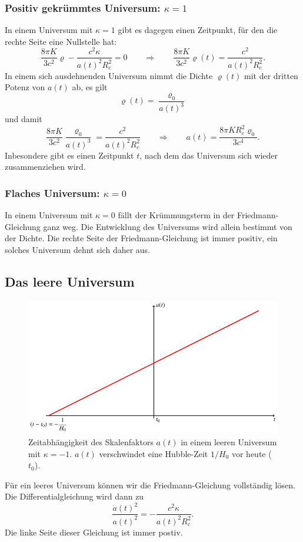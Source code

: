 \subsubsection{Positiv gekrümmtes Universum: $\kappa=1$}
In einem Universum mit $\kappa=1$ gibt es dagegen einen Zeitpunkt, für
den die rechte Seite eine Nullstelle hat:
\[
\frac{8\pi K}{3c^2}\varrho -\frac{c^2\kappa}{a(t)^2R_c^2}=0
\qquad\Rightarrow\qquad
\frac{8\pi K}{3c^2}\varrho(t)=\frac{c^2}{a(t)^2R_c^2}.
\]
In einem sich ausdehnenden Universum nimmt die Dichte $\varrho(t)$ mit
der dritten Potenz von $a(t)$ ab, es gilt
\[
\varrho(t) = \frac{\varrho_0}{a(t)^3}
\]
und damit
\[
\frac{8\pi K}{3c^2}\frac{\varrho_0}{a(t)^3}=\frac{c^2}{a(t)^2R_c^2}
\qquad\Rightarrow\qquad
a(t)
=
\frac{8\pi K R_c^2\varrho_0}{3c^4}.
\]
Inbesondere gibt es einen Zeitpunkt $t$, nach dem das Universum sich
wieder zusammenziehen wird.

\subsubsection{Flaches Universum: $\kappa=0$}
In einem Universum mit $\kappa=0$ fällt der Krümmungsterm in 
der Friedmann-Gleichung ganz weg.
Die Entwicklung des Universums wird allein bestimmt von der Dichte.
Die rechte Seite der Friedmann-Gleichung ist immer positiv, ein
solches Universum dehnt sich daher aus.

\subsection{Das leere Universum}
\begin{figure}
\centering
\includegraphics{chapters/tikz/friedmann-leer.pdf}
\caption{Zeitabhängigkeit des Skalenfaktors $a(t)$ in einem leeren
Universum mit $\kappa = -1$.
$a(t)$ verschwindet eine Hubble-Zeit $1/H_0$ vor heute ($t_0$).
\label{chapter:friedmann:graph:leer}}
\end{figure}
Für ein leeres Universum können wir die Friedmann-Gleichung vollständig
lösen.
Die Differentialgleichung wird dann zu
\[
\frac{\dot a(t)^2}{a(t)^2}
=
-\frac{c^2\kappa}{a(t)^2R_c^2}.
\]
Die linke Seite dieser Gleichung ist immer postiv.

